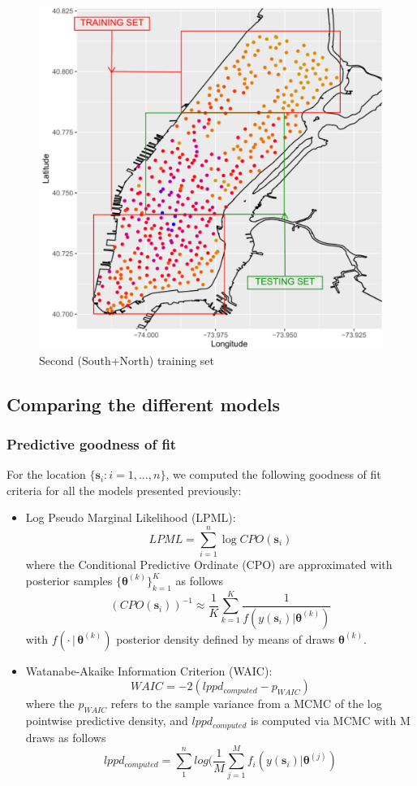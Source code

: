 \documentclass[12pt]{article}
\begin{document}
	\vspace{3 mm}
	\begin{figure}[H]
		\centering
		\includegraphics[scale=0.5]{Pictures/manhattan_map_test2.pdf}
		\caption{Second (South+North) training set}\label{bothset}
	\end{figure}



\subsection{Comparing the different models}
\subsubsection{Predictive goodness of fit}
For the location $\{\mathbf{s}_i : i=1,\dots,n\}$, we computed the following goodness of fit criteria for all the models presented previously:
\begin{itemize}
\item Log Pseudo Marginal Likelihood (LPML):
$$LPML = \sum_{i=1}^n \log{CPO(\mathbf{s}_i)}$$
where the Conditional Predictive Ordinate (CPO) are approximated with posterior samples $\{\boldsymbol{\theta}^{(k)} \}_{k=1}^K$ as follows
$$(CPO(\mathbf{s}_i))^{-1} \approx \frac{1}{K} \sum_{k=1}^K \frac{1}{f(y(\mathbf{s}_i) | \boldsymbol{\theta}^{(k)})}$$
with $f(\cdot \,|\, \boldsymbol{\theta}^{(k)})$ posterior density defined by means of draws $\boldsymbol{\theta}^{(k)}$.
\item Watanabe-Akaike Information Criterion (WAIC):
$$WAIC = -2(lppd_{computed}-p_{WAIC})$$
where the $p_{WAIC}$ refers to the sample variance from a MCMC of the log pointwise predictive density, and $lppd_{computed}$ is computed via MCMC with M draws as follows 
 $$lppd_{computed}= \sum_{1}^nlog( \frac{1}{M}\sum_{j=1}^{M}f_{i}(y(\mathbf{s}_i) | \boldsymbol{\theta}^{(j)})$$
\end{itemize}
\end{document}
